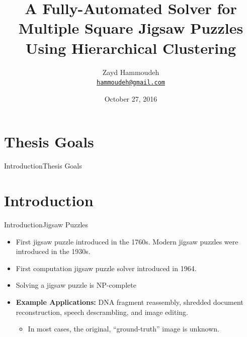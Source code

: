 \documentclass[10pt]{beamer}
\title[A Fully-Automated Solver for Multiple Square Jigsaw Puzzles Using Hierarchical Clustering]%
{\textbf{A Fully-Automated Solver for Multiple Square Jigsaw Puzzles Using Hierarchical Clustering}}
\subtitle{}  %
\date{October 27, 2016}
\author[Zayd Hammoudeh] %
{
    Zayd Hammoudeh\\
    \href{mailto:hammoudeh@gmail.com}{{\tt hammoudeh@gmail.com}}
}
\institute[
    Dept.\ of Computer Science\\
    San Jose State University\\
] %
{%
    Department of Computer Science\\
    San Jose State University\\
  
}
\begin{document}
{
\begin{frame}{}{} %
	\titlepage
\end{frame}}






\section{Thesis Goals}
\begin{frame}{Introduction}{Thesis Goals}
\end{frame}



\section{Introduction}
\begin{frame}{Introduction}{Jigsaw Puzzles}
  \begin{itemize}
    \item First jigsaw puzzle introduced in the 1760s.  Modern jigsaw puzzles were introduced in the 1930s.
    \vfill
    \item First computation jigsaw puzzle solver introduced in 1964.
    \vfill
    \item Solving a jigsaw puzzle is NP-complete~\cite{altman1990, demaine2007}
    \vfill
    \item<2-> \textbf{Example Applications:} DNA fragment reassembly, shredded document reconstruction, speech descrambling, and image editing.
    \begin{itemize}
        \item<3-> In most cases, the original, ``ground-truth'' image is unknown.
    \end{itemize}
  \end{itemize}
\end{frame}
\end{document}
